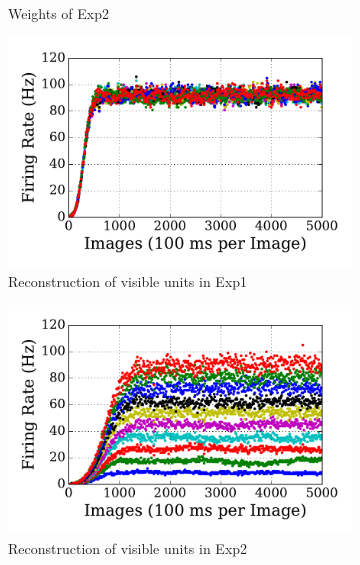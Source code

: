 \begin{figure}
\begin{subfigure}[t]{0.48\textwidth}
		\caption{Weights of Exp2}
	\end{subfigure}
	\begin{subfigure}[t]{0.48\textwidth}
		\includegraphics[width=\textwidth]{pics_sdlm/03_exp_SAE_noise_long/exp1_recon_s.pdf}
		\caption{Reconstruction of visible units in Exp1}
	\end{subfigure}
	\begin{subfigure}[t]{0.48\textwidth}
		\includegraphics[width=\textwidth]{pics_sdlm/03_exp_SAE_noise_long/exp2_recon_s.pdf}
		\caption{Reconstruction of visible units in Exp2}
	\end{subfigure}\\
	\begin{subfigure}[t]{0.48\textwidth}

\end{subfigure}
\end{figure}
